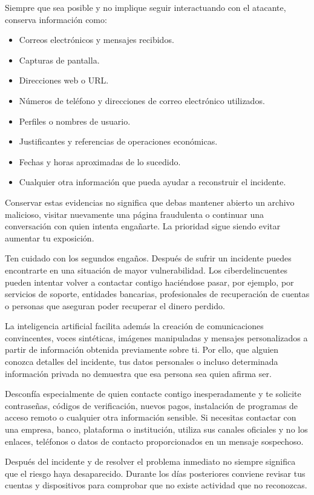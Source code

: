 \documentclass[
  spanish,
  a4paper,
  openany]{book}
\begin{document}
Siempre que sea posible y no implique seguir interactuando con el atacante, conserva información como:

\begin{itemize}
\item
  Correos electrónicos y mensajes recibidos.
\item
  Capturas de pantalla.
\item
  Direcciones web o URL.
\item
  Números de teléfono y direcciones de correo electrónico utilizados.
\item
  Perfiles o nombres de usuario.
\item
  Justificantes y referencias de operaciones económicas.
\item
  Fechas y horas aproximadas de lo sucedido.
\item
  Cualquier otra información que pueda ayudar a reconstruir el incidente.
\end{itemize}

Conservar estas evidencias no significa que debas mantener abierto un archivo malicioso, visitar nuevamente una página fraudulenta o continuar una conversación con quien intenta engañarte. La prioridad sigue siendo evitar aumentar tu exposición.

Ten cuidado con los segundos engaños. Después de sufrir un incidente puedes encontrarte en una situación de mayor vulnerabilidad. Los ciberdelincuentes pueden intentar volver a contactar contigo haciéndose pasar, por ejemplo, por servicios de soporte, entidades bancarias, profesionales de recuperación de cuentas o personas que aseguran poder recuperar el dinero perdido.

La inteligencia artificial facilita además la creación de comunicaciones convincentes, voces sintéticas, imágenes manipuladas y mensajes personalizados a partir de información obtenida previamente sobre ti. Por ello, que alguien conozca detalles del incidente, tus datos personales o incluso determinada información privada no demuestra que esa persona sea quien afirma ser.

Desconfía especialmente de quien contacte contigo inesperadamente y te solicite contraseñas, códigos de verificación, nuevos pagos, instalación de programas de acceso remoto o cualquier otra información sensible. Si necesitas contactar con una empresa, banco, plataforma o institución, utiliza sus canales oficiales y no los enlaces, teléfonos o datos de contacto proporcionados en un mensaje sospechoso.

Después del incidente y de resolver el problema inmediato no siempre significa que el riesgo haya desaparecido. Durante los días posteriores conviene revisar tus cuentas y dispositivos para comprobar que no existe actividad que no reconozcas.
\end{document}
